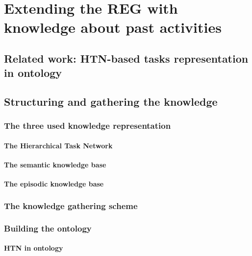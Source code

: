\ifdefined{}
\else
\setcounter{chapter}{6} %
\dominitoc
\faketableofcontents
\fi

\chapter{Extending the REG with knowledge about past activities}
\minitoc

\section{Related work: HTN-based tasks representation in ontology}

\section{Structuring and gathering the knowledge}

\subsection{The three used knowledge representation}

\subsubsection{The Hierarchical Task Network}

\subsubsection{The semantic knowledge base}

\subsubsection{The episodic knowledge base}

\subsection{The knowledge gathering scheme}

\subsection{Building the ontology}

\subsubsection{HTN in ontology}

